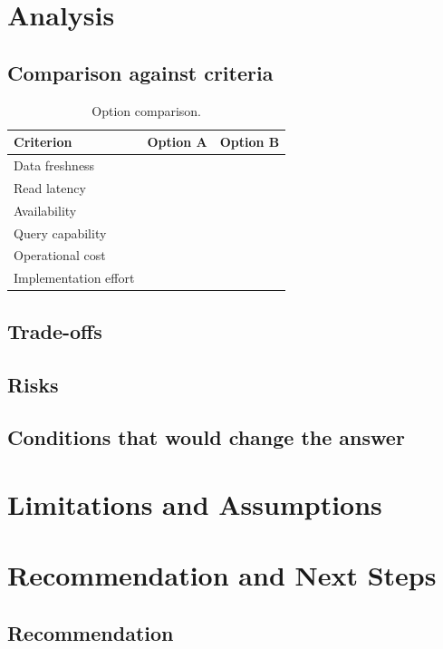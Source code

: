 \documentclass[11pt,a4paper]{article}
\begin{document}
\section{Analysis}

\subsection{Comparison against criteria}

\begin{table}[h]
\centering
\caption{Option comparison.}
\begin{tabular}{@{}lll@{}}
\toprule
Criterion & Option A & Option B \\
\midrule
Data freshness        & & \\
Read latency          & & \\
Availability          & & \\
Query capability      & & \\
Operational cost      & & \\
Implementation effort & & \\
\bottomrule
\end{tabular}
\end{table}

\subsection{Trade-offs}

\subsection{Risks}

\subsection{Conditions that would change the answer}

\section{Limitations and Assumptions}

\section{Recommendation and Next Steps}

\subsection{Recommendation}
\end{document}
